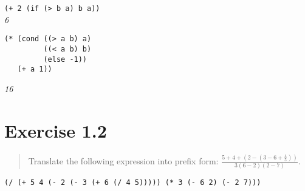 \documentclass{article}
\begin{document}
\noindent \lstinline|(+ 2 (if (> b a) b a))| \\
\emph{6}

\begin{lstlisting}
(* (cond ((> a b) a)
         ((< a b) b)
         (else -1))
   (+ a 1))
\end{lstlisting}
\emph{16}

\section{Exercise 1.2}

\begin{quote}
    Translate the following expression into prefix form:
    \begin{math}
        \frac{5+4+(2-(3-6+\frac{4}{5}))}{3(6-2)(2-7)}
    \end{math}.
\end{quote}

\lstinline|(/ (+ 5 4 (- 2 (- 3 (+ 6 (/ 4 5))))) (* 3 (- 6 2) (- 2 7)))|
\end{document}
